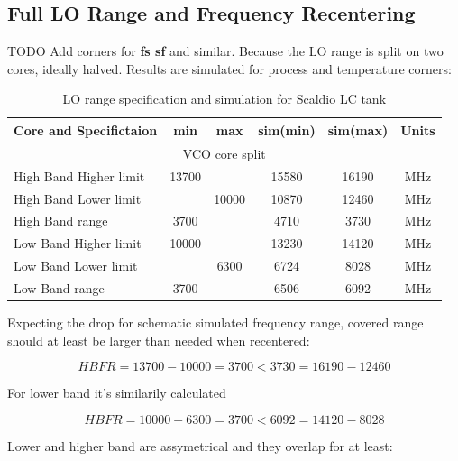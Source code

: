 \subsection{Full LO Range and Frequency Recentering}


TODO Add corners for \textbf{fs sf} and similar. Because the LO range is split on two cores, ideally halved. Results are simulated for process and temperature corners: 

\begin{table}[ht]
	\centering
	\begin{tabular}{|l|c|c|c|c|c|}
		\hline
		Core and Specifictaion & min & max & sim(min) & sim(max) & Units \\
		\hline
		\multicolumn{6}{|c|}{VCO core split} \\
		\hline
		High Band Higher limit & 13700 &  & 15580 & 16190  &  MHz  \\ 
		\hline
		High Band Lower limit &  & 10000 & 10870 & 12460 &  MHz  \\ 
		\hline
		High Band range & 3700 &  & 4710 & 3730 &  MHz  \\ 
		\hline
		Low Band Higher limit & 10000 &   & 13230 & 14120 &  MHz  \\ 
		\hline
		Low Band Lower limit &  & 6300 & 6724 & 8028  &  MHz  \\ 
		\hline
		Low Band range & 3700 &  & 6506 & 6092 &  MHz  \\ 
		\hline
	\end{tabular}
	\caption{LO range specification and simulation for Scaldio LC tank}
\end{table}

Expecting the drop for schematic simulated frequency range, covered range should at least be larger than needed when recentered: 

\begin{equation}
	HBFR = 13700 - 10000 = 3700 < 3730 = 16190 - 12460
\end{equation}

For lower band it's similarily calculated

\begin{equation}
	HBFR = 10000 - 6300 = 3700 < 6092 = 14120 - 8028
\end{equation}

Lower and higher band are assymetrical and they overlap for at least:

